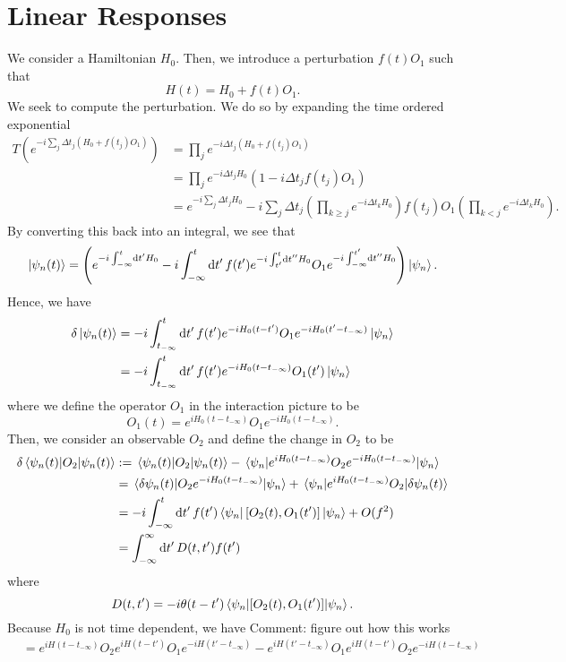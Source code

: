 \documentclass[twoside,symmetric, openany, 12pt]{./tuftebook}
\theoremstyle{definition}
\theoremstyle{definition}
\theoremstyle{definition}
\renewcommand\comment[1]{ {\color{red} Comment: #1}}
\begin{document}
	\section{Linear Responses}
	We consider a Hamiltonian $H_0$. Then, we introduce a perturbation $f(t)O_1$ such that
	\[
	H(t) = H_0+f(t) O_1
	.\] 
	We seek to compute the perturbation. We do so by expanding the time ordered exponential
	\begin{align*}
		T(e^{-i \sum_j \Delta t_j (H_0 + f(t_j) O_1)})&= \prod_j e^{-i \Delta t_j (H_0 + f(t_j) O_1)}\\
		&= \prod_j e^{-i \Delta t_j H_0} (1- i \Delta t_j f(t_j) O_1)\\
		&= e^{-i \sum_j \Delta t_j H_0} - i \sum_j \Delta t_j \left( \prod_{k\ge j}e^{-i \Delta t_k H_0} \right) f(t_j) O_1 \left( \prod_{k < j} e^{-i \Delta t_k H_0} \right).
	\end{align*}
	By converting this back into an integral, we see that
	\[
	\ket{\psi_n(t)} = \left(e^{-i \int_{-\infty}^t \dd{t'}H_0} - i \int_{-\infty}^t \dd{t'} f(t') e^{-i \int_{t'}^t \dd{t^{\prime\prime}} H_0} O_1 e^{-i\int_{-\infty}^{t'} \dd{t''}H_0}\right)\ket{\psi_n}
	.\] 
	Hence, we have
	\begin{align*}
		\delta \ket{\psi_n(t)} &= -i\int_{t_{-\infty}}^t \dd{t'}f(t')e^{-iH_0(t-t')}O_1 e^{-iH_0(t'-t_{-\infty})} \ket{\psi_n}\\
		&= -i\int_{t_{-\infty}}^t \dd{t'}f(t') e^{-iH_0(t-t_{-\infty})}O_1(t')\ket{\psi_n}
	\end{align*}
	where we define the operator $O_1$ in the interaction picture to be
	\[
	O_1(t) = e^{iH_0(t-t_{-\infty})}O_1e^{-iH_0(t-t_{-\infty})}
	.\] 
	Then, we consider an observable $O_2$ and define the change in $O_2$ to be
	\begin{align*}
		\delta \mel{\psi_n(t)}{O_2}{\psi_n(t)} &:= \mel{\psi_n(t)}{O_2}{\psi_n(t)} - \mel{\psi_n}{e^{iH_0(t-t_{-\infty})}O_2 e^{-i H_0 (t-t_{-\infty})}}{\psi_n}\\
		&= \mel{\delta\psi_n(t)}{O_2e^{-iH_0(t-t_{-\infty})}}{\psi_n} + \mel{\psi_n}{e^{iH_0(t-t_{-\infty})}O_2}{\delta\psi_n(t)}\\
		&= -i\int_{-\infty}^t \dd{t'} f(t') \bra{\psi_n}[O_2(t), O_1(t')]\ket{\psi_n}+O(f^2)\\
		&=\int_{-\infty}^\infty \dd{t'}D(t,t')f(t')
	\end{align*}
where
\[
D(t, t') =   -i\theta(t-t') \mel{\psi_n}{[O_2(t), O_1(t')]}{\psi_n}
.\] 
Because $ H_0$ is not time dependent, we have \comment{figure out how this works}
\begin{align*}
	[O_2(t), O_1(t')] &=  e^{iH(t-t_{-\infty})}O_2 e^{iH(t-t')}O_1 e^{-iH(t'-t_{-\infty})} - e^{iH(t'-t_{-\infty})}O_1 e^{iH(t-t')} O_2 e^{-iH(t-t_{-\infty})}
\end{align*}
\end{document}
